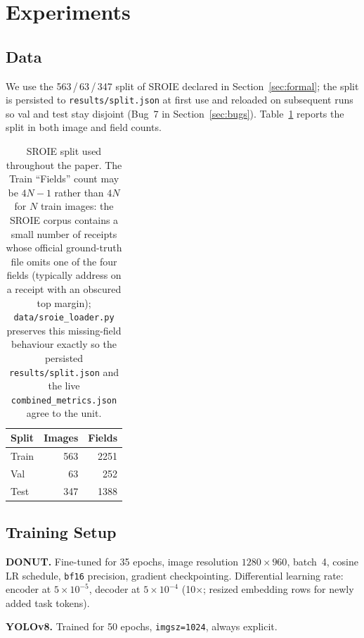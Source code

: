 \documentclass[conference]{IEEEtran}
\begin{document}
\section{Experiments}
\label{sec:experiments}

\subsection{Data}
We use the
563\,/\,63\,/\,347
split of SROIE declared in
Section~\ref{sec:formal}; the split is persisted to
\texttt{results/split.json} at first use and reloaded on subsequent
runs so val and test stay disjoint (Bug~7 in
Section~\ref{sec:bugs}).  Table~\ref{tab:splits} reports the split
in both image and field counts.

\begin{table}[!t]
\centering
\caption{SROIE split used throughout the paper.  The Train ``Fields''
         count may be $4N{-}1$ rather than $4N$ for $N$ train images:
         the SROIE corpus contains a small number of receipts whose
         official ground-truth file omits one of the four fields
         (typically address on a receipt with an obscured top
         margin); \texttt{data/sroie\_loader.py} preserves this
         missing-field behaviour exactly so the persisted
         \texttt{results/split.json} and the live
         \texttt{combined\_metrics.json} agree to the unit.}
\label{tab:splits}
\begin{tabular}{lrr}
\toprule
Split & Images & Fields \\ \midrule
Train & 563 & 2251 \\
Val   & 63   & 252 \\
Test  & 347  & 1388 \\ \bottomrule
\end{tabular}
\end{table}

\subsection{Training Setup}

\textbf{DONUT.}
Fine-tuned for 35 epochs, image resolution
$1280\times960$, batch~4,
cosine LR schedule, \texttt{bf16} precision,
gradient checkpointing.  Differential learning rate:
encoder at $\ensuremath{5\times 10^{-5}}$, decoder at $\ensuremath{5\times 10^{-4}}$
(10$\times$; resized embedding rows for newly added task tokens).

\textbf{YOLOv8.}
Trained for 50 epochs,
\texttt{imgsz=1024}, always explicit.
\end{document}
